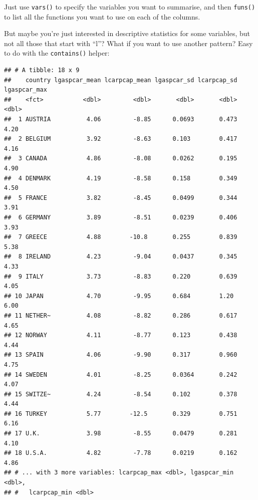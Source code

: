 \documentclass[]{gitbook}
\newenvironment{Shaded}{\begin{snugshade}}{\end{snugshade}}
\newcommand{\KeywordTok}[1]{\textcolor[rgb]{0.13,0.29,0.53}{\textbf{#1}}}
\newcommand{\NormalTok}[1]{#1}
\newcommand{\OperatorTok}[1]{\textcolor[rgb]{0.81,0.36,0.00}{\textbf{#1}}}
\newcommand{\StringTok}[1]{\textcolor[rgb]{0.31,0.60,0.02}{#1}}
\begin{document}
Just use \texttt{vars()} to specify the variables you want to summarise, and then \texttt{funs()} to list all the
functions you want to use on each of the columns.

But maybe you're just interested in descriptive statistics for some variables, but not all those
that start with ``l''? What if you want to use another pattern? Easy to do with the \texttt{contains()}
helper:

\begin{Shaded}
\end{Shaded}

\begin{verbatim}
## # A tibble: 18 x 9
##    country lgaspcar_mean lcarpcap_mean lgaspcar_sd lcarpcap_sd lgaspcar_max
##    <fct>           <dbl>         <dbl>       <dbl>       <dbl>        <dbl>
##  1 AUSTRIA          4.06         -8.85      0.0693       0.473         4.20
##  2 BELGIUM          3.92         -8.63      0.103        0.417         4.16
##  3 CANADA           4.86         -8.08      0.0262       0.195         4.90
##  4 DENMARK          4.19         -8.58      0.158        0.349         4.50
##  5 FRANCE           3.82         -8.45      0.0499       0.344         3.91
##  6 GERMANY          3.89         -8.51      0.0239       0.406         3.93
##  7 GREECE           4.88        -10.8       0.255        0.839         5.38
##  8 IRELAND          4.23         -9.04      0.0437       0.345         4.33
##  9 ITALY            3.73         -8.83      0.220        0.639         4.05
## 10 JAPAN            4.70         -9.95      0.684        1.20          6.00
## 11 NETHER~          4.08         -8.82      0.286        0.617         4.65
## 12 NORWAY           4.11         -8.77      0.123        0.438         4.44
## 13 SPAIN            4.06         -9.90      0.317        0.960         4.75
## 14 SWEDEN           4.01         -8.25      0.0364       0.242         4.07
## 15 SWITZE~          4.24         -8.54      0.102        0.378         4.44
## 16 TURKEY           5.77        -12.5       0.329        0.751         6.16
## 17 U.K.             3.98         -8.55      0.0479       0.281         4.10
## 18 U.S.A.           4.82         -7.78      0.0219       0.162         4.86
## # ... with 3 more variables: lcarpcap_max <dbl>, lgaspcar_min <dbl>,
## #   lcarpcap_min <dbl>
\end{verbatim}
\end{document}
